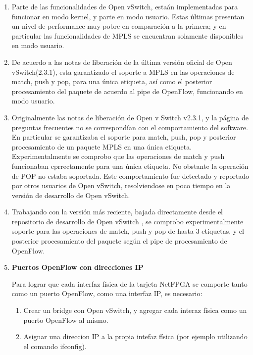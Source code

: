 \begin{enumerate}
\item Parte de las funcionalidades de Open vSwitch, esta\'an implementadas para funcionar en modo kernel, y parte en modo usuario. Estas \'ultimas presentan un nivel de performance muy pobre en comparaci\'on a la primera; y en particular las funcionalidades de MPLS se encuentran solamente disponibles en modo usuario.

\item De acuerdo a las notas de liberaci\'on de la \'ultima versi\'on oficial de Open vSwitch(2.3.1), 
esta garantizado el soporte a MPLS en las operaciones de match, push y pop, para una \'unica etiqueta, as\'i como el posterior procesamiento del paquete de acuerdo al pipe de OpenFlow, funcionando en modo usuario.

\item Originalmente las notas de liberaci\'on de Open v Switch v2.3.1, y la p\'agina de preguntas frecuentes no se correspond\'ian con el comportamiento del software. En particular se garantizaba el soporte para match, push, pop y posterior procesamiento de un paquete MPLS en una \'unica etiqueta.
Experimentalmente se comprobo que las operaciones de match y push funcionaban cprrectamente para una \'unica etiqueta. No obstante la operaci\'on de POP no estaba soportada. Este comportamiento fue detectado y reportado por otros usuarios de Open vSwitch, resolviendose en poco tiempo en la versi\'on de desarrollo de Open vSwitch.

\item Trabajando con la versi\'on m\'as reciente, bajada directamente desde el repositorio de desarrollo de Open vSwitch , se comprobo experimentalmente soporte para las operaciones de match, push y pop de hasta 3 etiquetas, y el posterior procesamiento del paquete seg\'un el pipe de procesamiento de OpenFlow.

\item \textbf{Puertos OpenFlow con direcciones IP}
 
Para lograr que cada interfaz f\'isica de la tarjeta NetFPGA se comporte tanto como un puerto OpenFlow, como una interfaz IP, es necesario:

\begin{enumerate}
\item Crear un bridge con Open vSwitch, y agregar cada interaz f\'isica como un puerto OpenFlow al mismo.
\item Asignar una direccion IP a la propia intefaz f\'isica (por ejemplo utilizando el comando ifconfig).
\end{enumerate}


\end{enumerate}
